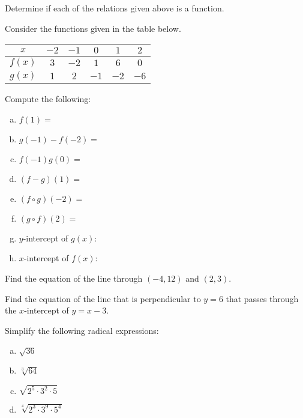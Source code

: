 \documentclass[11pt,letterpaper]{article}
\begin{document}
Determine if each of the relations given above is a function. \pspace


\prob Consider the functions given in the table below.
        \begin{table}[H]
        \centering
        \begin{tabular}{| c || c | c | c | c | c |} \hline
	$x$ & $-2$ & $-1$ & $0$ & $1$ & $2$ \\ \hline
	$f(x)$ & $3$ & $-2$ & $1$ & $6$ & $0$ \\ \hline
	$g(x)$ & $1$ & $2$ & $-1$ & $-2$ & $-6$ \\ \hline
        \end{tabular}
        \end{table}

Compute the following: \pspace
        \begin{enumerate}[(a)]
        \item $f(1)=$ 
        \item $g(-1) - f(-2)=$ 
        \item $f(-1)g(0)=$ 
        \item $(f - g)(1)=$ 
        \item $(f \circ g)(-2)=$ 
        \item $(g \circ f)(2)=$ 
        \item $y$-intercept of $g(x)$: 
        \item $x$-intercept of $f(x)$: 
        \end{enumerate} \pspace


\prob Find the equation of the line through $(-4, 12)$ and $(2, 3)$. \pspace


\prob Find the equation of the line that is perpendicular to $y= 6$ that passes through the $x$-intercept of $y= x - 3$. \pspace


\prob Simplify the following radical expressions: \pspace
	\begin{enumerate}[(a)]
	\item $\sqrt{36}$ 
	\item $\sqrt[3]{64}$ 
	\item $\sqrt{2^5 \cdot 3^2 \cdot 5}$ 
	\item $\sqrt[4]{2^3 \cdot 3^9 \cdot 5^4}$ 
	\end{enumerate} \pspace
\end{document}
